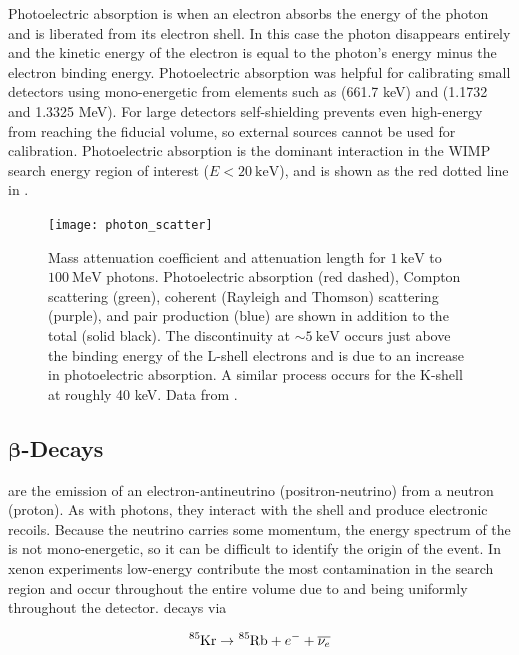 Photoelectric absorption is when an electron absorbs the energy of the photon and is liberated from its electron shell.  In this case the
photon disappears entirely and the kinetic energy of the electron is equal to the photon's energy minus the electron binding
energy.  Photoelectric absorption was helpful for calibrating small detectors using mono-energetic \gammarays from elements such as
\cesium (661.7 keV) and \cobaltsixty
(1.1732 and 1.3325 MeV).  For large detectors self-shielding prevents even high-energy \gammarays from reaching the fiducial
volume, so external sources cannot be used for calibration.  Photoelectric absorption is the dominant interaction in the WIMP search
energy region of interest ($E < 20\ \mathrm{keV}$), and is shown as the red dotted line in .

\begin{figure}
 \centering
 \texttt{[image: photon\_scatter]}
 \caption{Mass attenuation coefficient and attenuation length for $1\ \mathrm{keV}$ to $100\ \mathrm{MeV}$ photons.  Photoelectric
 absorption (red dashed), Compton scattering (green), coherent (Rayleigh and Thomson) scattering (purple), and pair production (blue) are
 shown in addition to the total (solid black).  The discontinuity at ${\sim}5\ \mathrm{keV}$ occurs just above the binding energy of the
 L-shell electrons and is due to an increase in photoelectric absorption.  A similar process occurs for the K-shell at
 roughly 40 keV.  Data from .}
 \label{fig:phot_atten}
\end{figure}


\subsection[$\beta$-Decays][$\beta$-Decays]{$\mathbf{\beta}$-Decays}
\label{subsec:beta}
\betadecays are the emission of an electron-antineutrino (positron-neutrino) from a neutron (proton).  As with photons, they interact
with the \electron shell and produce electronic recoils.  Because the neutrino carries
some momentum, the energy spectrum of the \electron is not mono-energetic, so it can be difficult to identify the origin of the event.  In
xenon
experiments low-energy \betadecays contribute the most contamination in the search region and occur throughout the entire volume due to
 and  being uniformly throughout the detector.  \krypton decays via

\begin{equation}
\ce{^{85}Kr} \rightarrow \ce{^{85}Rb} + e^{-} + \overline{\nu_{e}}
\end{equation}

